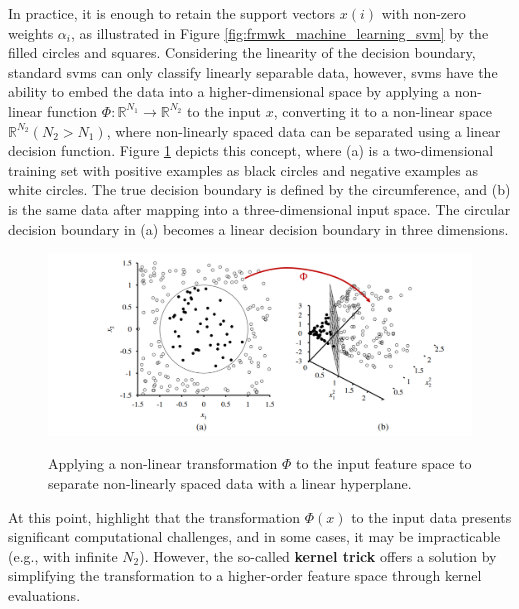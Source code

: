 In practice, it is enough to retain the support vectors $x(i)$ with non-zero weights $\alpha_i$, as illustrated in Figure \ref{fig:frmwk_machine_learning_svm} by the filled circles and squares. Considering the linearity of the decision boundary, standard \gls{svm}s can only classify linearly separable data, however, \gls{svm}s have the ability to embed the data into a higher-dimensional space by applying a non-linear function $\Phi: \mathbb{R}^{N_1} \rightarrow \mathbb{R}^{N_2}$ to the input $x$, converting it to a non-linear space $\mathbb{R}^{N_2} (N_2 > N_1)$, where non-linearly spaced data can be separated using a linear decision function. Figure \ref{fig:frmwk_machine_learning_svm_kernel_trick} depicts this concept, where (a) is a two-dimensional training set with positive examples as black circles and negative examples as white circles. The true decision boundary is defined by the circumference, and (b) is the same data after mapping into a three-dimensional input space. The circular decision boundary in (a) becomes a linear decision boundary in three dimensions.

\begin{figure}[htbp]
    \raggedright
        \caption{Applying a non-linear transformation $\Phi$ to the input feature space to separate non-linearly spaced data with a linear hyperplane.}
        \includegraphics[width=1\textwidth]{resources/images/030-theoretical_framework/Framework_machine_learning_SVM_kernel_trick.png}
        \label{fig:frmwk_machine_learning_svm_kernel_trick}
\end{figure}

At this point, \textcite{Russel2010} highlight that the transformation $\Phi(x)$ to the input data presents significant computational challenges, and in some cases, it may be impracticable (e.g., with infinite $N_2$). However, the so-called \textbf{kernel trick} offers a solution by simplifying the transformation to a higher-order feature space through kernel evaluations. 

